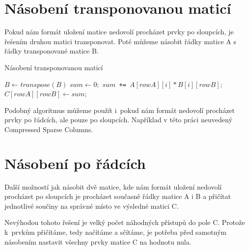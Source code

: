 
\section{Násobení transponovanou maticí}

Pokud nám formát uložení matice nedovolí procházet prvky po sloupcích, je řešením druhou matici transponovat. Poté můžeme násobit řádky matice A s řádky transponované matice B.

\begin{algorithm}[H]
	\caption{Násobení transponovanou maticí}\label{mmm-transpose}
	\begin{algorithmic}[1]
\State \texttt{$B \gets transpose(B)$}
		\State \texttt{$sum \gets 0;$}
			\State \texttt{$sum $ += $ A[rowA][i] * B[i][rowB];$}
		\EndFor
		\State \texttt{$C[rowA][rowB] \gets sum;$}
	\EndFor
\EndFor
		\EndProcedure
	\end{algorithmic}
\end{algorithm}

Podobný algoritmus můžeme použít i~pokud nám formát nedovolí procházet prvky po řádcích, ale pouze po sloupcích. Například v této práci neuvedený Compressed Sparse Columns.



\section{Násobení po řádcích}

Další možností jak násobit dvě matice, kde nám formát uložení nedovolí procházet po sloupcích je procházet současně řádky matice A i B a přičítat jednotlivé součiny na správné místo ve výsledné matici C.

Nevýhodou tohoto řešení je velký počet náhodných přístupů do pole C. Protože k~prvkům přičítáme, tedy načítáme a sčítáme, je potřeba před samotným násobením nastavit všechny prvky matice C na hodnotu nula.


